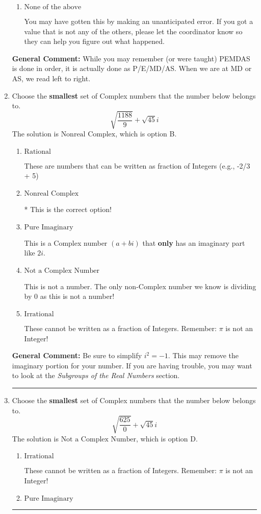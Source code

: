 \documentclass{extbook}[14pt]
\newcommand{\litem}[1]{\item #1

\rule{\textwidth}{0.4pt}}
\begin{document}
\begin{enumerate}
{\begin{enumerate}[label=\Alph*.]
* -0.836, this is the correct option
\item \( \text{None of the above} \)

 You may have gotten this by making an unanticipated error. If you got a value that is not any of the others, please let the coordinator know so they can help you figure out what happened.
\end{enumerate}

\textbf{General Comment:} While you may remember (or were taught) PEMDAS is done in order, it is actually done as P/E/MD/AS. When we are at MD or AS, we read left to right.
}
\litem{
Choose the \textbf{smallest} set of Complex numbers that the number below belongs to.
\[ \sqrt{\frac{1188}{9}}+\sqrt{45} i \]The solution is \( \text{Nonreal Complex} \), which is option B.\begin{enumerate}[label=\Alph*.]
\item \( \text{Rational} \)

These are numbers that can be written as fraction of Integers (e.g., -2/3 + 5)
\item \( \text{Nonreal Complex} \)

* This is the correct option!
\item \( \text{Pure Imaginary} \)

This is a Complex number $(a+bi)$ that \textbf{only} has an imaginary part like $2i$.
\item \( \text{Not a Complex Number} \)

This is not a number. The only non-Complex number we know is dividing by 0 as this is not a number!
\item \( \text{Irrational} \)

These cannot be written as a fraction of Integers. Remember: $\pi$ is not an Integer!
\end{enumerate}

\textbf{General Comment:} Be sure to simplify $i^2 = -1$. This may remove the imaginary portion for your number. If you are having trouble, you may want to look at the \textit{Subgroups of the Real Numbers} section.
}
\litem{
Choose the \textbf{smallest} set of Complex numbers that the number below belongs to.
\[ \sqrt{\frac{625}{0}}+\sqrt{45} i \]The solution is \( \text{Not a Complex Number} \), which is option D.\begin{enumerate}[label=\Alph*.]
\item \( \text{Irrational} \)

These cannot be written as a fraction of Integers. Remember: $\pi$ is not an Integer!
\item \( \text{Pure Imaginary} \)


\end{enumerate}}
\end{enumerate}
\end{document}
